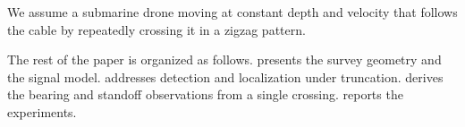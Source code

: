 We assume a submarine drone moving at constant depth and velocity that follows the cable by repeatedly crossing it in a zigzag pattern.

The rest of the paper is organized as follows.
 presents the survey geometry and the signal model.
 addresses detection and localization under truncation.
 derives the bearing and standoff observations from a single crossing.
 reports the experiments.